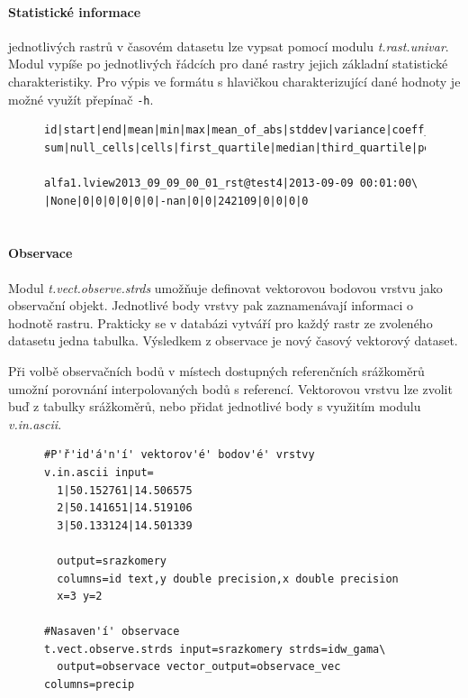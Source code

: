 \documentclass[a4paper,12pt,oneside]{report}
\begin{document}
\paragraph{Statistické informace } jednotlivých rastrů v časovém
datasetu lze vypsat pomocí modulu \textit{t.rast.univar}. Modul vypíše
po jednotlivých řádcích pro dané rastry jejich základní statistické
charakteristiky. Pro výpis ve formátu s hlavičkou charakterizující
dané hodnoty je možné využít přepínač \texttt{-h}.

\begin{figure}[h!]
\begin{footnotesize}
\lstset{extendedchars=false,
escapeinside=''}
\begin{lstlisting}[style=mybash]
id|start|end|mean|min|max|mean_of_abs|stddev|variance|coeff_var|\
sum|null_cells|cells|first_quartile|median|third_quartile|percentil

alfa1.lview2013_09_09_00_01_rst@test4|2013-09-09 00:01:00\
|None|0|0|0|0|0|0|-nan|0|0|242109|0|0|0|0
    
\end{lstlisting}
\end{footnotesize} 
\end{figure}


\paragraph{Observace}
Modul \textit{t.vect.observe.strds} umožňuje definovat vektorovou
bodovou vrstvu jako observační objekt. Jednotlivé body vrstvy pak
zaznamenávají informaci o hodnotě rastru. Prakticky se v databázi
vytváří pro každý rastr ze zvoleného datasetu jedna tabulka. Výsledkem
z observace je nový časový vektorový dataset.

Při volbě observačních bodů v místech dostupných referenčních
srážkoměrů umožní porovnání interpolovaných bodů s
referencí. Vektorovou vrstvu lze zvolit buď z tabulky srážkoměrů, nebo
přidat jednotlivé body s využitím modulu \textit{v.in.ascii}.
\begin{figure}[h!]
\begin{footnotesize}
\lstset{extendedchars=false,
escapeinside=''}
\begin{lstlisting}[style=mybash]
#P'ř'id'á'n'í' vektorov'é' bodov'é' vrstvy
v.in.ascii input=
  1|50.152761|14.506575
  2|50.141651|14.519106
  3|50.133124|14.501339
  
  output=srazkomery 
  columns=id text,y double precision,x double precision 
  x=3 y=2
  
#Nasaven'í' observace  
t.vect.observe.strds input=srazkomery strds=idw_gama\
  output=observace vector_output=observace_vec columns=precip
  
\end{lstlisting}
\end{footnotesize} 
\end{figure}
\end{document}
